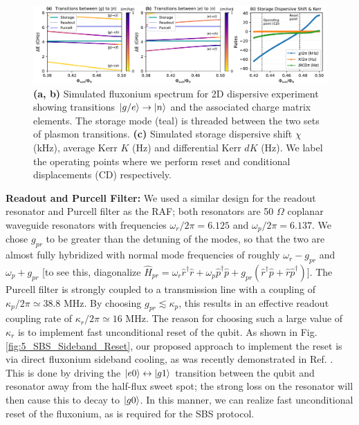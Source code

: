 \begin{figure}[h]
    \centering
    \includegraphics[width=\linewidth]{Figures/5/2D_dispersive_metrics.pdf}
    \caption{\textbf{(a, b)} Simulated fluxonium spectrum for 2D dispersive experiment showing transitions $\lvert g/e\rangle\to\lvert n\rangle$ and the associated charge matrix elements. The storage mode (teal) is threaded between the two sets of plasmon transitions. \textbf{(c)} Simulated storage dispersive shift $\chi$ (kHz), average Kerr $K$ (Hz) and differential Kerr $dK$ (Hz). We label the operating points where we perform reset and conditional displacements (CD) respectively.}
    \label{fig:5_2D_dispersive_metrics}
\end{figure}

\noindent \textbf{Readout and Purcell Filter:} We used a similar design for the readout resonator and Purcell filter as the RAF; both resonators are 50 $\Omega$ coplanar waveguide resonators with frequencies $\omega_r/2\pi = 6.125$ and $\omega_p/2\pi = 6.137$. We chose $g_{pr}$ to be greater than the detuning of the modes, so that the two are almost fully hybridized with normal mode frequencies of roughly $\omega_r - g_{pr}$ and $\omega_p + g_{pr}$ [to see this, diagonalize $\hat{H}_{pr} = \omega_r\hat{r}^\dagger \hat{r} + \omega_p\hat{p}^\dagger \hat{p} + g_{pr}(\hat{r}^\dagger\hat{p} + \hat{r}\hat{p}^\dagger)$]. The Purcell filter is strongly coupled to a transmission line with a coupling of $\kappa_p/2\pi \simeq 38.8$ MHz. By choosing $g_{pr} \lesssim \kappa_p$, this results in an effective readout coupling rate of $\kappa_r/2\pi \simeq 16$ MHz. The reason for choosing such a large value of $\kappa_r$ is to implement fast unconditional reset of the qubit. As shown in Fig. \ref{fig:5_SBS_Sideband_Reset}, our proposed approach to implement the reset is via direct fluxonium sideband cooling, as was recently demonstrated in Ref. \cite{najera2024high}. This is done by driving the $\lvert e0\rangle\leftrightarrow\lvert g1\rangle$ transition between the qubit and resonator away from the half-flux sweet spot; the strong loss on the resonator will then cause this to decay to $\lvert g0\rangle$. In this manner, we can realize fast unconditional reset of the fluxonium, as is required for the SBS protocol.

